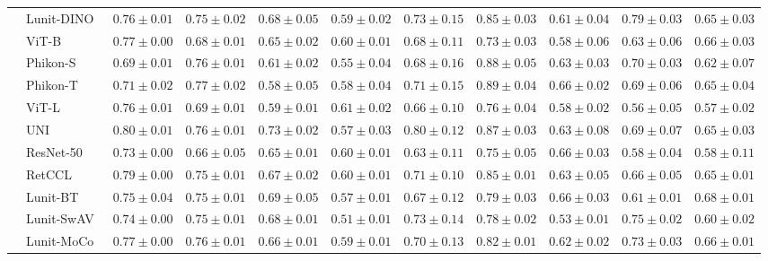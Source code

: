 \begin{tabular}{ll|cccc|c|cccc}
 & Lunit-DINO~\cite{kang2023benchmarking} & $0.76 \pm 0.01$ & $0.75 \pm 0.02$ & $0.68 \pm 0.05$ & $0.59 \pm 0.02$ & $0.73 \pm 0.15$ & $0.85 \pm 0.03$ & $0.61 \pm 0.04$ & $\mathbf{0.79 \pm 0.03}$ & $0.65 \pm 0.03$ \\
 & ViT-B~\cite{kolesnikov2021image} & $0.77 \pm 0.00$ & $0.68 \pm 0.01$ & $0.65 \pm 0.02$ & $0.60 \pm 0.01$ & $0.68 \pm 0.11$ & $0.73 \pm 0.03$ & $0.58 \pm 0.06$ & $0.63 \pm 0.06$ & $0.66 \pm 0.03$ \\
 & Phikon-S~\cite{filiot2023scaling} & $0.69 \pm 0.01$ & $0.76 \pm 0.01$ & $0.61 \pm 0.02$ & $0.55 \pm 0.04$ & $0.68 \pm 0.16$ & $0.88 \pm 0.05$ & $0.63 \pm 0.03$ & $0.70 \pm 0.03$ & $0.62 \pm 0.07$ \\
 & Phikon-T~\cite{filiot2023scaling} & $0.71 \pm 0.02$ & $\mathbf{0.77 \pm 0.02}$ & $0.58 \pm 0.05$ & $0.58 \pm 0.04$ & $0.71 \pm 0.15$ & $\mathbf{0.89 \pm 0.04}$ & $0.66 \pm 0.02$ & $0.69 \pm 0.06$ & $0.65 \pm 0.04$ \\
 & ViT-L~\cite{kolesnikov2021image} & $0.76 \pm 0.01$ & $0.69 \pm 0.01$ & $0.59 \pm 0.01$ & $0.61 \pm 0.02$ & $0.66 \pm 0.10$ & $0.76 \pm 0.04$ & $0.58 \pm 0.02$ & $0.56 \pm 0.05$ & $0.57 \pm 0.02$ \\
 & UNI~\cite{chen2024uni} & $\mathbf{0.80 \pm 0.01}$ & $0.76 \pm 0.01$ & $\mathbf{0.73 \pm 0.02}$ & $0.57 \pm 0.03$ & $\mathbf{0.80 \pm 0.12}$ & $0.87 \pm 0.03$ & $0.63 \pm 0.08$ & $0.69 \pm 0.07$ & $0.65 \pm 0.03$ \\
 & ResNet-50~\cite{he2015deep} & $0.73 \pm 0.00$ & $0.66 \pm 0.05$ & $0.65 \pm 0.01$ & $0.60 \pm 0.01$ & $0.63 \pm 0.11$ & $0.75 \pm 0.05$ & $0.66 \pm 0.03$ & $0.58 \pm 0.04$ & $0.58 \pm 0.11$ \\
 & RetCCL~\cite{wang2023retccl} & $0.79 \pm 0.00$ & $0.75 \pm 0.01$ & $0.67 \pm 0.02$ & $0.60 \pm 0.01$ & $0.71 \pm 0.10$ & $0.85 \pm 0.01$ & $0.63 \pm 0.05$ & $0.66 \pm 0.05$ & $0.65 \pm 0.01$ \\
 & Lunit-BT~\cite{kang2023benchmarking} & $0.75 \pm 0.04$ & $0.75 \pm 0.01$ & $0.69 \pm 0.05$ & $0.57 \pm 0.01$ & $0.67 \pm 0.12$ & $0.79 \pm 0.03$ & $0.66 \pm 0.03$ & $0.61 \pm 0.01$ & $\mathbf{0.68 \pm 0.01}$ \\
 & Lunit-SwAV~\cite{kang2023benchmarking} & $0.74 \pm 0.00$ & $0.75 \pm 0.01$ & $0.68 \pm 0.01$ & $0.51 \pm 0.01$ & $0.73 \pm 0.14$ & $0.78 \pm 0.02$ & $0.53 \pm 0.01$ & $0.75 \pm 0.02$ & $0.60 \pm 0.02$ \\
 & Lunit-MoCo~\cite{kang2023benchmarking} & $0.77 \pm 0.00$ & $0.76 \pm 0.01$ & $0.66 \pm 0.01$ & $0.59 \pm 0.01$ & $0.70 \pm 0.13$ & $0.82 \pm 0.01$ & $0.62 \pm 0.02$ & $0.73 \pm 0.03$ & $0.66 \pm 0.01$ \\
\cline{1-11}
\bottomrule
\end{tabular}
